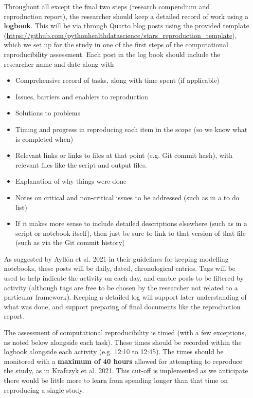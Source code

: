 Throughout all except the final two steps (research compendium and reproduction report), the researcher should keep a detailed record of work using a \textbf{logbook}. This will be via through Quarto blog posts using the provided template (\url{https://github.com/pythonhealthdatascience/stars_reproduction_template}), which we set up for the study in one of the first steps of the computational reproducibility assessment. Each post in the log book should include the researcher name and date along with -
\begin{itemize}
    \item Comprehensive record of tasks, along with time spent (if applicable)
    \item Issues, barriers and enablers to reproduction
    \item Solutions to problems
    \item Timing and progress in reproducing each item in the scope (so we know what is completed when)
    \item Relevant links or links to files at that point (e.g. Git commit hash), with relevant files like the script and output files.
    \item Explanation of why things were done
    \item Notes on critical and non-critical issues to be addressed (such as in a to do list)
    \item If it makes more sense to include detailed descriptions elsewhere (such as in a script or notebook itself), then just be sure to link to that version of that file (such as via the Git commit history)
\end{itemize}

As suggested by Ayllón et al. 2021\autocite{ayllon_keeping_2021} in their guidelines for keeping modelling notebooks, these posts will be daily, dated, chronological entries. Tags will be used to help indicate the activity on each day, and enable posts to be filtered by activity (although tags are free to be chosen by the researcher not related to a particular framework). Keeping a detailed log will support later understanding of what was done, and support preparing of final documents like the reproduction report.

The assessment of computational reproducibility is timed (with a few exceptions, as noted below alongside each task). These times should be recorded within the logbook alongside each activity (e.g. 12:10 to 12:45). The times should be monitored with a \textbf{maximum of 40 hours} allowed for attempting to reproduce the study, as in Krafczyk et al. 2021.\autocite{krafczyk_learning_2021} This cut-off is implemented as we anticipate there would be little more to learn from spending longer than that time on reproducing a single study.
